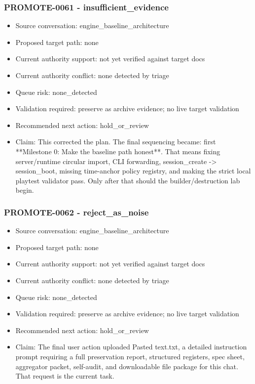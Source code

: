 \documentclass[11pt,a4paper]{report}
\begin{document}
\subsubsection{PROMOTE-0061 - insufficient\_evidence}

\begin{itemize}
\item Source conversation: engine\_baseline\_architecture
\item Proposed target path: none
\item Current authority support: not yet verified against target docs
\item Current authority conflict: none detected by triage
\item Queue risk: none\_detected
\item Validation required: preserve as archive evidence; no live target validation
\item Recommended next action: hold\_or\_review
\item Claim: This corrected the plan. The final sequencing became: first **Milestone 0: Make the baseline path honest**. That means fixing server/runtime circular import, CLI forwarding, session\_create -> session\_boot, missing time-anchor policy registry, and making the strict local playtest validator pass. Only after that should the builder/destruction lab begin.
\end{itemize}

\subsubsection{PROMOTE-0062 - reject\_as\_noise}

\begin{itemize}
\item Source conversation: engine\_baseline\_architecture
\item Proposed target path: none
\item Current authority support: not yet verified against target docs
\item Current authority conflict: none detected by triage
\item Queue risk: none\_detected
\item Validation required: preserve as archive evidence; no live target validation
\item Recommended next action: hold\_or\_review
\item Claim: The final user action uploaded Pasted text.txt, a detailed instruction prompt requiring a full preservation report, structured registers, spec sheet, aggregator packet, self-audit, and downloadable file package for this chat. That request is the current task.
\end{itemize}
\end{document}
